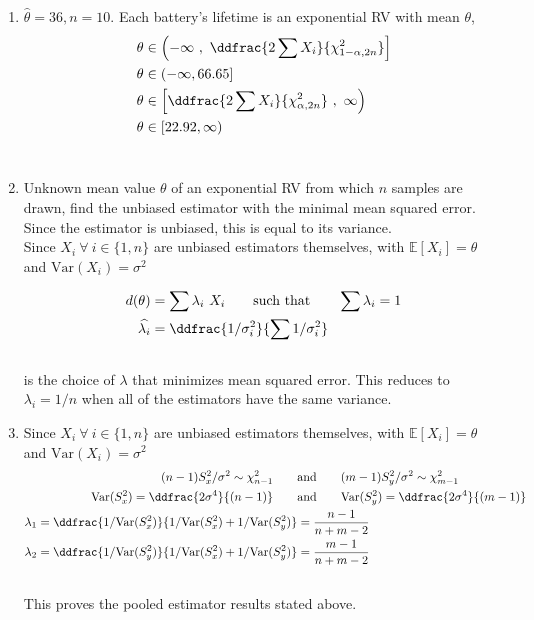 \begin{enumerate}
	
	\item $ \widehat{\theta}  = 36, n = 10$. Each battery's lifetime is an exponential RV with mean $ \theta $, \\
	
		\begin{align}
			\theta &\in \left(-\infty\ ,\ \ddfrac{2 \sum X_i}{\chi^2_{1 - \alpha, 2n}}\right] \nonumber \\
			\theta &\in (-\infty, 66.65] \\
			\theta &\in \left[\ddfrac{2 \sum X_i}{\chi^2_{\alpha, 2n}}\ ,\ \infty \right) \nonumber \\
			\theta &\in [22.92, \infty)
		\end{align}\\
	
	
	\item Unknown mean value $ \theta $ of an exponential RV from which $ n $ samples are drawn, find the unbiased estimator with the minimal mean squared error. Since the estimator is unbiased, this is equal to its variance. \\
	Since $ X_i \ \forall\ i \in \{1, n\}$ are unbiased estimators themselves, with $ \mathbb{E}[X_i] = \theta $ and $ \mathrm{Var}(X_i) = \sigma^2 $ 
	
		\begin{align}
			d(\theta) &= \sum \lambda_i\ X_i \qquad \text{such that} \qquad \sum \lambda_i = 1 \\
			\widehat{\lambda_i} &= \ddfrac{1/\sigma^2_i}{\sum 1/\sigma_i^2} 
		\end{align}\\
		is the choice of $ \lambda $ that minimizes mean squared error. This reduces to $ \lambda_i = 1/n $ when all of the estimators have the same variance.\\
	
	
	\item Since $ X_i \ \forall\ i \in \{1, n\}$ are unbiased estimators themselves, with $ \mathbb{E}[X_i] = \theta $ and $ \mathrm{Var}(X_i) = \sigma^2 $ \\
	
		\begin{align}
			(n-1)S_x^2 / \sigma^2 \sim \chi_{n-1}^2 \qquad &\text{and} \qquad (m-1)S_y^2 / \sigma^2 \sim \chi_{m-1}^2 \nonumber \\
			\mathrm{Var}(S_x^2) = \ddfrac{2\sigma^4}{(n-1)} \qquad &\text{and} \qquad \mathrm{Var}(S_y^2) = \ddfrac{2\sigma^4}{(m-1)} \nonumber \\
			\lambda_1 = \ddfrac{1/\mathrm{Var}(S_x^2)}{1/\mathrm{Var}(S_x^2) + 1/\mathrm{Var}(S_y^2)} &= \frac{n-1}{n+m-2} \\
			\lambda_2 = \ddfrac{1/\mathrm{Var}(S_y^2)}{1/\mathrm{Var}(S_x^2) + 1/\mathrm{Var}(S_y^2)} &= \frac{m-1}{n+m-2}
		\end{align}\\
		This proves the pooled estimator results stated above.\\
	

\end{enumerate}
